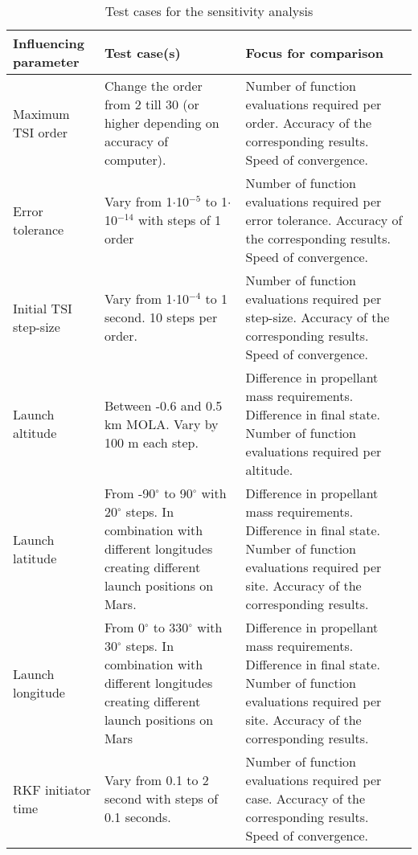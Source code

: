 \begin{table}[!ht]
\begin{center}
\caption{Test cases for the sensitivity analysis}
\label{tab:testCases1}
\begin{tabular}{|p{4cm}|p{6cm}|p{6cm}|}
\hline 
\textbf{Influencing parameter} & \textbf{Test case(s)} & \textbf{Focus for comparison}  \\ \hline 
Maximum \ac{TSI} order & Change the order from 2 till 30 (or higher depending on accuracy of computer). & Number of function evaluations required per order. Accuracy of the corresponding results. Speed of convergence. \\ \hline
Error tolerance & Vary from 1$\cdot$10$^{-5}$ to 1$\cdot$10$^{-14}$ with steps of 1 order & Number of function evaluations required per error tolerance. Accuracy of the corresponding results. Speed of convergence. \\ \hline
Initial \ac{TSI} step-size & Vary from 1$\cdot$10$^{-4}$ to 1 second. 10 steps per order. & Number of function evaluations required per step-size. Accuracy of the corresponding results. Speed of convergence. \\ \hline

Launch altitude & Between -0.6 and 0.5 km \ac{MOLA}. Vary by 100 m each step. & Difference in propellant mass requirements. Difference in final state. Number of function evaluations required per altitude. \\ \hline
Launch latitude & From -90$^{\circ}$ to 90$^{\circ}$ with 20$^{\circ}$ steps. In combination with different longitudes creating different launch positions on Mars. & Difference in propellant mass requirements. Difference in final state. Number of function evaluations required per site. Accuracy of the corresponding results. \\ \hline
Launch longitude & From 0$^{\circ}$ to 330$^{\circ}$ with 30$^{\circ}$ steps. In combination with different longitudes creating different launch positions on Mars & Difference in propellant mass requirements. Difference in final state. Number of function evaluations required per site. Accuracy of the corresponding results. \\ \hline

\ac{RKF} initiator time & Vary from 0.1 to 2 second with steps of 0.1 seconds. & Number of function evaluations required per case. Accuracy of the corresponding results. Speed of convergence. \\ \hline

 
\end{tabular}
\end{center}
\end{table}



